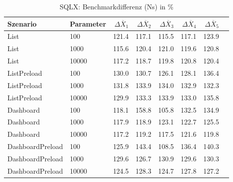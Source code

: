 
\begin{table}[ht]
\setlength{\extrarowheight}{-1pt}
\centering
\caption{SQLX: Benchmarkdifferenz (Ns) in \%}
\begin{tabular}{llrrrrrr}
\toprule
Szenario & Parameter & ${\Delta \overline{X}_1}$ & ${\Delta \overline{X}_2}$ & ${\Delta \overline{X}_3}$ & ${\Delta \overline{X}_4}$ & ${\Delta \overline{X}_5}$ \\
\midrule
	List & 100 & \cellcolor{red!19}  121.4 & \cellcolor{red!17}  117.1 & \cellcolor{red!16}  115.5 & \cellcolor{red!17}  117.1 & \cellcolor{red!20}  123.9 \\
	List & 1000 & \cellcolor{red!16}  115.6 & \cellcolor{red!18}  120.4 & \cellcolor{red!18}  121.0 & \cellcolor{red!18}  119.6 & \cellcolor{red!18}  120.8 \\
	List & 10000 & \cellcolor{red!17}  117.2 & \cellcolor{red!17}  118.7 & \cellcolor{red!18}  119.8 & \cellcolor{red!18}  120.8 & \cellcolor{red!18}  120.4 \\
	ListPreload & 100 & \cellcolor{red!22}  130.0 & \cellcolor{red!22}  130.7 & \cellcolor{red!20}  126.1 & \cellcolor{red!21}  128.1 & \cellcolor{red!25}  136.4 \\
	ListPreload & 1000 & \cellcolor{red!23}  131.8 & \cellcolor{red!24}  133.9 & \cellcolor{red!24}  134.0 & \cellcolor{red!23}  132.9 & \cellcolor{red!23}  132.3 \\
	ListPreload & 10000 & \cellcolor{red!22}  129.9 & \cellcolor{red!23}  133.3 & \cellcolor{red!24}  133.9 & \cellcolor{red!23}  133.0 & \cellcolor{red!24}  135.8 \\
	Dashboard & 100 & \cellcolor{red!17}  118.1 & \cellcolor{red!30}  158.8 & \cellcolor{red!12}  105.8 & \cellcolor{red!23}  132.5 & \cellcolor{red!24}  134.9 \\
	Dashboard & 1000 & \cellcolor{red!17}  117.9 & \cellcolor{red!18}  118.9 & \cellcolor{red!19}  123.1 & \cellcolor{red!19}  122.7 & \cellcolor{red!20}  125.5 \\
	Dashboard & 10000 & \cellcolor{red!17}  117.2 & \cellcolor{red!18}  119.2 & \cellcolor{red!17}  117.5 & \cellcolor{red!19}  121.6 & \cellcolor{red!18}  119.8 \\
	DashboardPreload & 100 & \cellcolor{red!20}  125.9 & \cellcolor{red!27}  143.4 & \cellcolor{red!13}  108.5 & \cellcolor{red!25}  136.4 & \cellcolor{red!26}  140.3 \\
	DashboardPreload & 1000 & \cellcolor{red!22}  129.6 & \cellcolor{red!21}  126.7 & \cellcolor{red!22}  130.9 & \cellcolor{red!22}  129.6 & \cellcolor{red!22}  130.3 \\
	DashboardPreload & 10000 & \cellcolor{red!20}  124.5 & \cellcolor{red!21}  128.3 & \cellcolor{red!20}  124.7 & \cellcolor{red!21}  127.8 & \cellcolor{red!21}  127.2 \\
\bottomrule
\end{tabular}
\label{tab:benchmarkdifferenz_sqlx_ns}
\end{table}
	